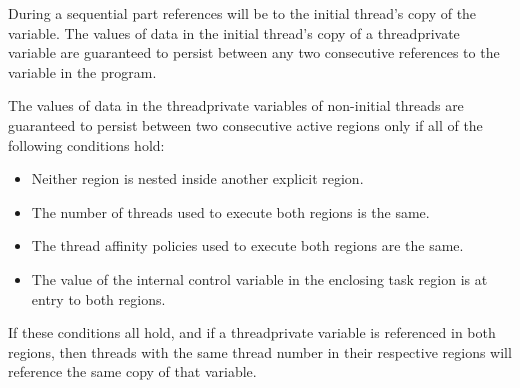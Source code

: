 During a sequential part references will be to the initial thread's copy of the variable.
The values of data in the initial thread's copy of a threadprivate variable are guaranteed
to persist between any two consecutive references to the variable in the program.

The values of data in the threadprivate variables of non-initial threads
are guaranteed to persist between two consecutive active 
regions only if all of the following conditions hold:

\begin{itemize}  %
\item Neither  region is nested inside another explicit  region.

\item The number of threads used to execute both  regions is the same.

\item The thread affinity policies used to execute both  regions are the same.

\item The value of the  internal control variable in the enclosing task region is 
at entry to both  regions.
\end{itemize} %

If these conditions all hold, and if a threadprivate variable is referenced in both regions,
then threads with the same thread number in their respective regions will reference the
same copy of that variable.

